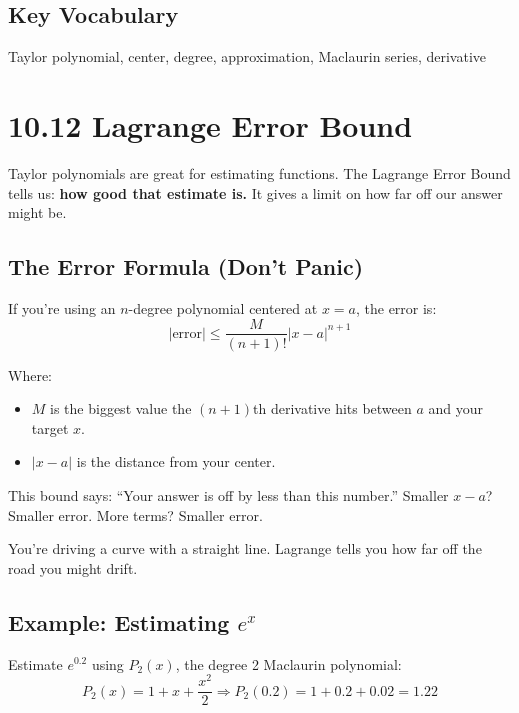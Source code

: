 \documentclass{article}
\begin{document}
\subsection*{Key Vocabulary}
Taylor polynomial, center, degree, approximation, Maclaurin series, derivative

\newpage
\section{10.12 Lagrange Error Bound}

\begin{tcolorbox}[colback=gray!8,colframe=black,title=Big-Idea (Plain Words)]
Taylor polynomials are great for estimating functions.
The Lagrange Error Bound tells us: \textbf{how good that estimate is.}
It gives a limit on how far off our answer might be.
\end{tcolorbox}

\subsection*{The Error Formula (Don’t Panic)}
If you’re using an \(n\)-degree polynomial centered at \(x = a\), the error is:
\[
| \text{error} | \le \frac{M}{(n+1)!} |x - a|^{n+1}
\]

Where:
\begin{itemize}
  \item \(M\) is the biggest value the \((n+1)\)th derivative hits between \(a\) and your target \(x\).
  \item \(|x - a|\) is the distance from your center.
\end{itemize}

This bound says: “Your answer is off by less than this number.”
Smaller \(x - a\)? Smaller error. More terms? Smaller error.

\begin{tcolorbox}[colback=gray!6,colframe=black,title=Think of it like this:]
You're driving a curve with a straight line.
Lagrange tells you how far off the road you might drift.
\end{tcolorbox}

\subsection*{Example: Estimating \(e^x\)}

Estimate \(e^{0.2}\) using \(P_2(x)\), the degree 2 Maclaurin polynomial:
\[
P_2(x) = 1 + x + \frac{x^2}{2}
\Rightarrow P_2(0.2) = 1 + 0.2 + 0.02 = 1.22
\]
\end{document}

